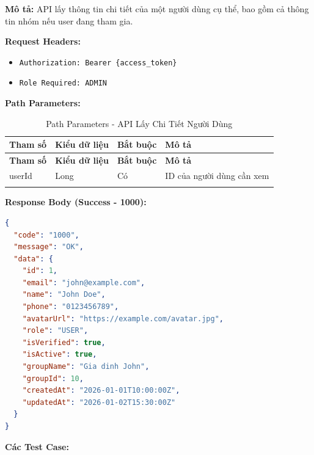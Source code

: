 \textbf{Mô tả:} API lấy thông tin chi tiết của một người dùng cụ thể, bao gồm cả thông tin nhóm nếu user đang tham gia.

\textbf{Request Headers:}
\begin{itemize}
    \item \texttt{Authorization: Bearer \{access\_token\}}
    \item \texttt{Role Required: ADMIN}
\end{itemize}

\textbf{Path Parameters:}

\small
\begin{longtable}{|>{\raggedright\arraybackslash}p{3.5cm}|>{\raggedright\arraybackslash}p{2.5cm}|>{\raggedright\arraybackslash}p{2cm}|>{\raggedright\arraybackslash}p{5.5cm}|}
\hline
\textbf{Tham số} & \textbf{Kiểu dữ liệu} & \textbf{Bắt buộc} & \textbf{Mô tả} \\
\hline
\endfirsthead
\hline
\textbf{Tham số} & \textbf{Kiểu dữ liệu} & \textbf{Bắt buộc} & \textbf{Mô tả} \\
\hline
\endhead
userId & Long & Có & ID của người dùng cần xem \\
\hline
\caption{Path Parameters - API Lấy Chi Tiết Người Dùng}
\end{longtable}

\textbf{Response Body (Success - 1000):}

\begin{lstlisting}[language=json, caption=Response thanh cong API 8.3]
{
  "code": "1000",
  "message": "OK",
  "data": {
    "id": 1,
    "email": "john@example.com",
    "name": "John Doe",
    "phone": "0123456789",
    "avatarUrl": "https://example.com/avatar.jpg",
    "role": "USER",
    "isVerified": true,
    "isActive": true,
    "groupName": "Gia dinh John",
    "groupId": 10,
    "createdAt": "2026-01-01T10:00:00Z",
    "updatedAt": "2026-01-02T15:30:00Z"
  }
}
\end{lstlisting}

\textbf{Các Test Case:}

